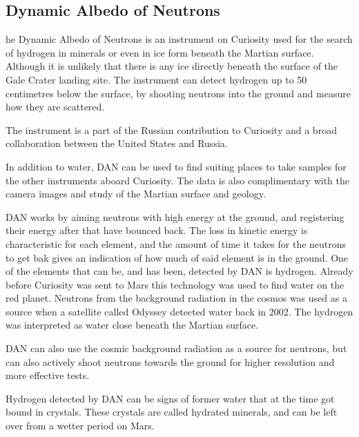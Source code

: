 \subsection{Dynamic Albedo of Neutrons}
he Dynamic Albedo of Neutrons is an instrument on Curiosity used for the search of hydrogen in minerals or even in ice form beneath the Martian surface.
Although it is unlikely that there is any ice directly beneath the surface of the Gale Crater landing site.
The instrument can detect hydrogen up to 50 centimetres below the surface, by shooting neutrons into the ground and measure how they are scattered.

The instrument is a part of the Russian contribution to Curiosity and a broad collaboration between the United States and Russia.

In addition to water, DAN can be used to find suiting places to take samples for the other instruments aboard Curiosity.
The data is also complimentary with the camera images and study of the Martian surface and geology.

DAN works by aiming neutrons with high energy at the ground, and registering their energy after that have bounced back.
The loss in kinetic energy is characteristic for each element, and the amount of time it takes for the neutrons to get bak gives an indication of how much of said element is in the ground.
One of the elements that can be, and has been, detected by DAN is hydrogen.
Already before Curiosity was sent to Mars this technology was used to find water on the red planet.
Neutrons from the background radiation in the cosmos was used as a source when a satellite called Odyssey detected water back in 2002.
The hydrogen was interpreted as water close beneath the Martian surface.

DAN can also use the cosmic background radiation as a source for neutrons, but can also actively shoot neutrons towards the ground for higher resolution and more effective tests.

Hydrogen detected by DAN can be signs of former water that at the time got bound in crystals.
These crystals are called hydrated minerals, and can be left over from a wetter period on Mars.